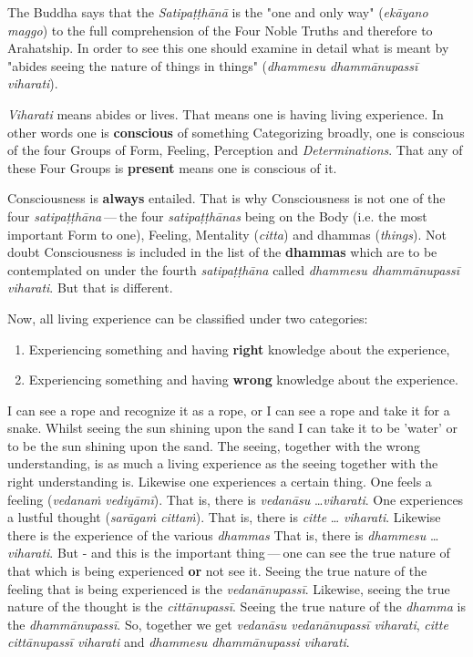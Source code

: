 The Buddha says that the \emph{Satipaṭṭhānā} is the "one and only way"
(\emph{ekāyano maggo}) to the full comprehension of the Four Noble Truths
and therefore to Arahatship. In order to see this one should examine in
detail what is meant by "abides seeing the nature of things in things"
(\emph{dhammesu dhammānupassī viharati}).


\emph{Viharati} means abides or lives. That means one is having living
experience. In other words one is \textbf{conscious} of something Categorizing
broadly, one is conscious of the four Groups of Form, Feeling,
Perception and \emph{Determinations}. That any of these Four Groups is
\textbf{present} means one is conscious of it.


Consciousness is \textbf{always} entailed. That is why Consciousness is not one
of the four \emph{satipaṭṭhāna} — the four \emph{satipaṭṭhānas} being on the Body
(i.e. the most important Form to one), Feeling, Mentality (\emph{citta})
and dhammas (\emph{things}). Not doubt Consciousness is included in the
list of the \textbf{dhammas} which are to be contemplated on under the fourth
\emph{satipaṭṭhāna} called \emph{dhammesu dhammānupassī viharati}. But that is
different.


Now, all living experience can be classified under two categories:


\begin{enumerate}

\item{Experiencing something and having \textbf{right} knowledge about the experience,}

\item{Experiencing something and having \textbf{wrong} knowledge about the experience.}

\end{enumerate}


I can see a rope and recognize it as a rope, or I can see a rope and
take it for a snake. Whilst seeing the sun shining upon the sand I can
take it to be 'water' or to be the sun shining upon the sand. The
seeing, together with the wrong understanding, is as much a living
experience as the seeing together with the right understanding is.
Likewise one experiences a certain thing. One feels a feeling (\emph{vedanaṁ
vediyāmī}). That is, there is \emph{vedanāsu} …​ \emph{viharati}. One
experiences a lustful thought (\emph{sarāgaṁ cittaṁ}). That is, there is
\emph{citte} …​ \emph{viharati}. Likewise there is the experience of the
various \emph{dhammas} That is, there is \emph{dhammesu} …​ \emph{viharati}. But -
and this is the important thing — one can see the true nature of that
which is being experienced \textbf{or} not see it. Seeing the true nature of
the feeling that is being experienced is the \emph{vedanānupassī}.
Likewise, seeing the true nature of the thought is the \emph{cittānupassī}.
Seeing the true nature of the \emph{dhamma} is the \emph{dhammānupassī}. So,
together we get \emph{vedanāsu vedanānupassī viharati}, \emph{citte cittānupassī
viharati} and \emph{dhammesu dhammānupassi viharati}.


